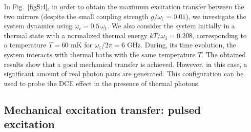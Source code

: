 \documentclass[aps,pra,twocolumn,floatfix,longbibliography, superscriptaddress]{revtex4-1}
\begin{document}
In Fig.~\ref{figS:4}, in order to obtain the maximum excitation transfer between the two mirrors (despite the small coupling strength $g/ \omega_{1} = 0.01$), we investigate the system dynamics using $\omega_c=0.5\, \omega_1$. 
We also consider the system  initially in a thermal state  with a normalized thermal energy $k T / \omega_1 = 0.208$, corresponding to a temperature $T = 60$ mK for $\omega_1 / 2 \pi = 6$ GHz. During, its time evolution, the system interacts with  thermal baths with the same temperature $T$.  
The obtained results show that a good mechanical transfer is achieved.
However, in this case, a significant amount of real photon pairs are generated. This configuration can be used to probe the DCE effect in the presence of thermal photons. 


\subsection{Mechanical excitation transfer: pulsed excitation}
\label{Subsec:E}
\end{document}
